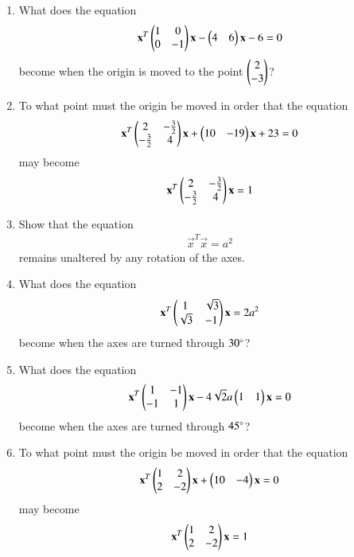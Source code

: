 \renewcommand{\theequation}{\theenumi}
\begin{enumerate}[label=\arabic*.,ref=\thesubsection.\theenumi]
\item What does the equation 
\begin{align}
\mathbf{x}^T\begin{pmatrix}1 & 0\\0 & -1\end{pmatrix}\mathbf{x}-\begin{pmatrix}4 & 6\end{pmatrix}\mathbf{x}-6=0
\end{align}
become when the origin is moved to the point $\begin{pmatrix}2\\-3\end{pmatrix}$?
\\
\solution

\item To what point must the origin be moved in order that the equation
\begin{align}
\mathbf{x}^T\begin{pmatrix}2 & -\frac{3}{2}\\ -\frac{3}{2} & 4\end{pmatrix}\mathbf{x}+\begin{pmatrix}10 & -19\end{pmatrix}\mathbf{x}+23=0
\end{align}
may become
\begin{align}
\mathbf{x}^T\begin{pmatrix}2 & -\frac{3}{2}\\ -\frac{3}{2} & 4\end{pmatrix}\mathbf{x} = 1
\end{align}
\item Show that the equation
\begin{align}
\vec{x}^T\vec{x}= a^2
\end{align}
remains unaltered by any rotation of the axes.
\item What does the equation
\begin{align}
\mathbf{x}^T\begin{pmatrix}1 & \sqrt{3}\\ \sqrt{3} & -1\end{pmatrix}\mathbf{x} = 2a^2
\end{align}
become when the axes are turned through $30\degree$?
\item What does the equation
\begin{align}
\mathbf{x}^T\begin{pmatrix}1 & -1\\-1 & 1\end{pmatrix}\mathbf{x}-4\sqrt{2}a\begin{pmatrix}1 & 1\end{pmatrix}\mathbf{x}=0
\end{align}
become when the axes are turned through $45\degree$?
\item To what point must the origin be moved in order that the equation
\begin{align}
\mathbf{x}^T\begin{pmatrix}1 & 2\\2 & -2\end{pmatrix}\mathbf{x}+\begin{pmatrix}10 & -4\end{pmatrix}\mathbf{x}=0
\end{align}
may become
\begin{align}
\mathbf{x}^T\begin{pmatrix}1 & 2\\2 & -2\end{pmatrix}\mathbf{x}= 1
\end{align}

\end{enumerate}
